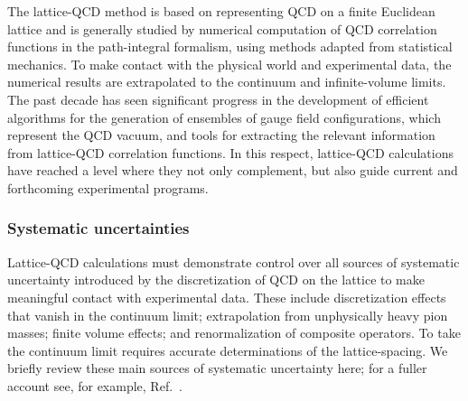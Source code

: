The lattice-QCD method is based on
representing QCD on a finite Euclidean lattice and is generally
studied by numerical computation of QCD correlation functions in the
path-integral formalism, using methods adapted from statistical
mechanics.
%
%
To make contact with the physical world and experimental
data, the numerical results are extrapolated to the continuum 
and infinite-volume limits.
%
The past decade has seen significant progress in
the development of efficient algorithms for the generation of
ensembles of gauge field configurations, which represent the QCD
vacuum, and tools for extracting the relevant information from lattice-QCD
correlation functions.
%
In this respect, lattice-QCD calculations have reached a level where
they not only complement, but also guide current and forthcoming
experimental programs.

\subsubsection{Systematic uncertainties}
Lattice-QCD calculations must demonstrate control over all sources of
systematic uncertainty introduced by the discretization of QCD on the
lattice to make meaningful contact with experimental data.
%
These
include discretization effects that vanish in the continuum limit;
extrapolation from unphysically heavy pion masses; finite volume
effects; and renormalization of composite operators.
%
To take the 
continuum limit requires accurate determinations of the lattice-spacing. 
We briefly review these main sources of systematic
uncertainty here; for a fuller account see, for
example, Ref.~\cite{Aoki:2016frl}.

